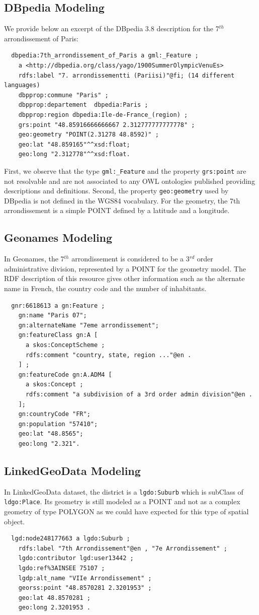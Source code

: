 \subsection{DBpedia Modeling}
We provide below an excerpt of the DBpedia 3.8 description for the 7$^{th}$ arrondissement of Paris:
{\small
\begin{verbatim}
  dbpedia:7th_arrondissement_of_Paris a gml:_Feature ;
    a <http://dbpedia.org/class/yago/1900SummerOlympicVenuEs>
    rdfs:label "7. arrondissementti (Pariisi)"@fi; (14 different languages)
    dbpprop:commune "Paris" ;
    dbpprop:departement  dbpedia:Paris ;
    dbpprop:region dbpedia:Ile-de-France_(region) ;
    grs:point "48.85916666666667 2.312777777777778" ;
    geo:geometry "POINT(2.31278 48.8592)" ;
    geo:lat "48.859165"^^xsd:float;
    geo:long "2.312778"^^xsd:float.
\end{verbatim}
}
First, we observe that the type \texttt{gml:\_Feature} and the property \texttt{grs:point} are not resolvable and are not associated to any OWL ontologies published providing descriptions and definitions. Second, the property \texttt{geo:geometry} used by DBpedia is not defined in the WGS84 vocabulary. For the geometry, the 7th arrondissement is a simple POINT defined by a latitude and a longitude.

\subsection{Geonames Modeling}
In Geonames, the 7$^{th}$ arrondissement is considered to be a 3$^{rd}$ order administrative division, represented by a POINT for the geometry model. The RDF description of this resource gives other information such as the alternate name in French, the country code and the number of inhabitants.
{\small
\begin{verbatim}
  gnr:6618613 a gn:Feature ;
    gn:name "Paris 07";
    gn:alternateName "7eme arrondissement";
    gn:featureClass gn:A [
      a skos:ConceptScheme ;
      rdfs:comment "country, state, region ..."@en .
    ] ;
    gn:featureCode gn:A.ADM4 [
      a skos:Concept ;
      rdfs:comment "a subdivision of a 3rd order admin division"@en .
    ];
    gn:countryCode "FR";
    gn:population "57410";
    geo:lat "48.8565";
    geo:long "2.321".
\end{verbatim}
}

\subsection{LinkedGeoData Modeling}
In LinkedGeoData dataset, the district is a \texttt{lgdo:Suburb} which is  subClass of \texttt{ldgo:Place}. Its geometry is still modeled as a POINT and not as a complex geometry of type POLYGON as we could have expected for this type of spatial object.
{\small
\begin{verbatim}
  lgd:node248177663 a lgdo:Suburb ;
    rdfs:label "7th Arrondissement"@en , "7e Arrondissement" ;
    lgdo:contributor lgd:user13442 ;
    lgdo:ref%3AINSEE 75107 ;
    lgdp:alt_name "VIIe Arrondissement" ;
    georss:point "48.8570281 2.3201953" ;
    geo:lat 48.8570281 ;
    geo:long 2.3201953 .
\end{verbatim}
}

